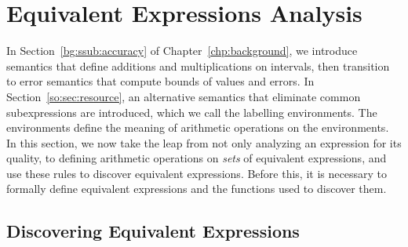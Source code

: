 \section{Equivalent Expressions Analysis}
\label{so:sec:equivalent}

In Section~\ref{bg:ssub:accuracy} of Chapter~\ref{chp:background}, we introduce
semantics that define additions and multiplications on intervals, then
transition to error semantics that compute bounds of values and errors.  In
Section~\ref{so:sec:resource}, an alternative semantics that eliminate common
subexpressions are introduced, which we call the labelling environments.  The
environments define the meaning of arithmetic operations on the environments.
In this section, we now take the leap from not only analyzing an expression for
its quality, to defining arithmetic operations on \emph{sets} of equivalent
expressions, and use these rules to discover equivalent expressions.  Before
this, it is necessary to formally define equivalent expressions and the
functions used to discover them.


\subsection{Discovering Equivalent Expressions}
\label{so:sub:equivalent_relations}

